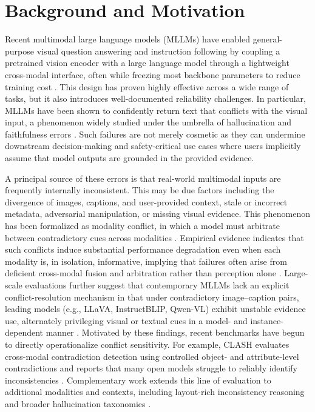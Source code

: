 \documentclass{article}
\begin{document}
\section{Background and Motivation}
\label{sec:background}

Recent multimodal large language models (MLLMs) have enabled general-purpose visual question answering and instruction following by coupling a pretrained vision encoder with a large language model through a lightweight cross-modal interface, often while freezing most backbone parameters to reduce training cost \citep{dai_instructblip_2023, li_blip-2_2023, liu_visual_2023}. This design has proven highly effective across a wide range of tasks, but it also introduces well-documented reliability challenges. In particular, MLLMs have been shown to confidently return text that conflicts with the visual input, a phenomenon widely studied under the umbrella of hallucination and faithfulness errors \citep{li_evaluating_2023, favero_multi-modal_2024, seth_towards_2025}. Such failures are not merely cosmetic as they can undermine downstream decision-making and safety-critical use cases where users implicitly assume that model outputs are grounded in the provided evidence.

A principal source of these errors is that real-world multimodal inputs are frequently internally inconsistent. This may be due factors including the divergence of images, captions, and user-provided context, stale or incorrect metadata, adversarial manipulation, or missing visual evidence. This phenomenon has been formalized as modality conflict, in which a model must arbitrate between contradictory cues across modalities \citep{zhang_robust_2025}. Empirical evidence indicates that such conflicts induce substantial performance degradation even when each modality is, in isolation, informative, implying that failures often arise from deficient cross-modal fusion and arbitration rather than perception alone \citep{zhang_robust_2025, hua_how_2025}. Large-scale evaluations further suggest that contemporary MLLMs lack an explicit conflict-resolution mechanism in that under contradictory image--caption pairs, leading models (e.g., LLaVA, InstructBLIP, Qwen-VL) exhibit unstable evidence use, alternately privileging visual or textual cues in a model- and instance-dependent manner \citep{hua_how_2025}. Motivated by these findings, recent benchmarks have begun to directly operationalize conflict sensitivity. For example, CLASH evaluates cross-modal contradiction detection using controlled object- and attribute-level contradictions and reports that many open models struggle to reliably identify inconsistencies \citep{popordanoska_clash_2025}. Complementary work extends this line of evaluation to additional modalities and contexts, including layout-rich inconsistency reasoning and broader hallucination taxonomies \citep{yan_multimodal_2025, chen_survey_2025}.
\end{document}
